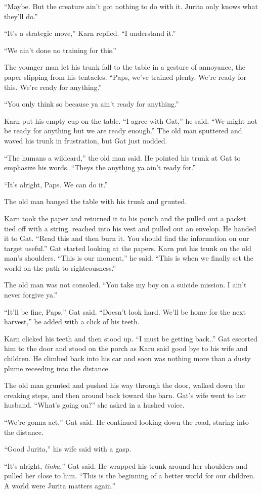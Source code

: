 ``Maybe. But the creature ain't got nothing to do with it. Jurita only knows what they'll do.''

``It's a strategic move,'' Karn replied. ``I understand it.''

``We ain't done no training for this.''

The younger man let his trunk fall to the table in a gesture of annoyance, the paper slipping
from his tentacles. ``Paps, we've trained plenty. We're ready for this. We're ready for
anything.''

``You only think so because ya ain't ready for anything.''

Karn put his empty cup on the table. ``I agree with Gat,'' he said. ``We might not be ready for
anything but we are ready enough.'' The old man sputtered and waved his trunk in frustration,
but Gat just nodded.

``The humans a wildcard,'' the old man said. He pointed his trunk at Gat to emphasize his words.
``Theys the anything ya ain't ready for.''

``It's alright, Paps. We can do it.''

The old man banged the table with his trunk and grunted.

Karn took the paper and returned it to his pouch and the pulled out a packet tied off with a
string. reached into his vest and pulled out an envelop. He handed it to Gat. ``Read this and
then burn it. You should find the information on our target useful.'' Gat started looking at the
papers. Karn put his trunk on the old man's shoulders. ``This is our moment,'' he said. ``This
is when we finally set the world on the path to righteousness.''

The old man was not consoled. ``You take my boy on a suicide mission. I ain't never forgive
ya.''

``It'll be fine, Paps,'' Gat said. ``Doesn't look hard. We'll be home for the next harvest,'' he
added with a click of his teeth.

Karn clicked his teeth and then stood up. ``I must be getting back..'' Gat escorted him to the
door and stood on the porch as Karn said good bye to his wife and children. He climbed back into
his car and soon was nothing more than a dusty plume receeding into the distance.

The old man grunted and pushed his way through the door, walked down the creaking steps, and
then around back toward the barn. Gat's wife went to her husband. ``What's going on?'' she asked
in a hushed voice.

``We're gonna act,'' Gat said. He continued looking down the road, staring into the distance.

``Good Jurita,'' his wife said with a gasp.

``It's alright, \textit{tinka},'' Gat said. He wrapped his trunk around her shoulders and pulled
her close to him. ``This is the beginning of a better world for our children. A world were
Jurita matters again.''
